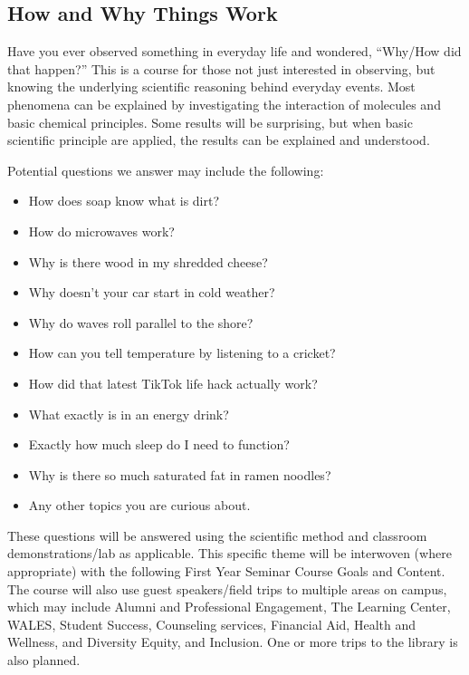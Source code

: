 \documentclass[11pt,letterpaper]{article}
\begin{document}
\subsection{How and Why Things Work}
Have you ever observed something in everyday life and wondered, ``Why/How did
that happen?'' This is a course for those not just interested in observing, but
knowing the underlying scientific reasoning behind everyday events. Most
phenomena can be explained by investigating the interaction of molecules and
basic chemical principles. Some results will be surprising, but when basic
scientific principle are applied, the results can be explained and understood.

Potential questions we answer may include the following:
\begin{multicols}{2}
\begin{itemize}[nosep]
	\item How does soap know what is dirt?
	\item How do microwaves work?
	\item Why is there wood in my shredded cheese?
	\item Why doesn't your car start in cold weather?
	\item Why do waves roll parallel to the shore?
	\item How can you tell temperature by listening to a cricket?
	\item How did that latest TikTok life hack actually work?
	\item What exactly is in an energy drink?
	\item Exactly how much sleep do I need to function?
	\item Why is there so much saturated fat in ramen noodles?
	\item Any other topics you are curious about.
\end{itemize}
\end{multicols}
These questions will be answered using the scientific method and classroom
demonstrations/lab as applicable. This specific theme will be interwoven (where
appropriate) with the following First Year Seminar Course Goals and Content. The
course will also use guest speakers/field trips to multiple areas on campus,
which may include Alumni and Professional Engagement, The Learning Center,
WALES, Student Success, Counseling services, Financial Aid, Health and Wellness,
and Diversity Equity, and Inclusion. One or more trips to the library is also
planned.
\end{document}
